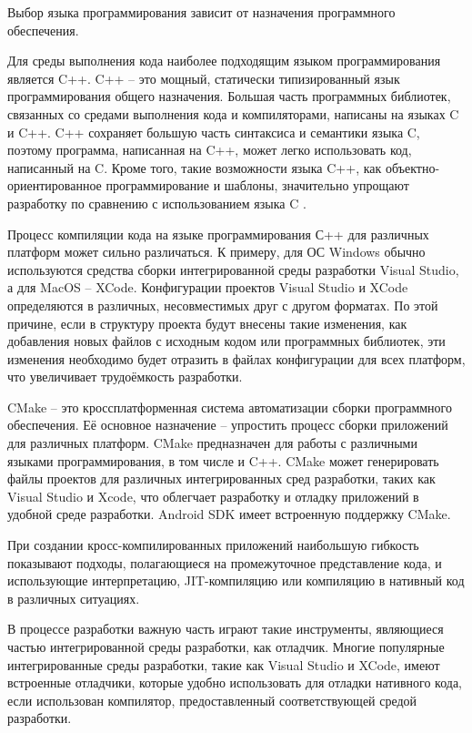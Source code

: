 Выбор языка программирования зависит от назначения программного обеспечения.

Для среды выполнения кода наиболее подходящим языком программирования является C++.
C++ -- это мощный, статически типизированный язык программирования общего назначения. 
Большая часть программных библиотек, связанных со средами выполнения кода и компиляторами, написаны на языках C и C++.
C++ сохраняет большую часть синтаксиса и семантики языка C, поэтому программа, написанная на C++, может легко использовать код, написанный на C.
Кроме того, такие возможности языка C++, как объектно-ориентированное программирование и шаблоны, значительно упрощают разработку по сравнению с использованием языка C \cite{CPlusPlus}.

Процесс компиляции кода на языке программирования С++ для различных платформ может сильно различаться.
К примеру, для ОС Windows обычно используются средства сборки интегрированной среды разработки Visual Studio, а для MacOS -- XCode.
Конфигурации проектов Visual Studio и XCode определяются в различных, несовместимых друг с другом форматах.
По этой причине, если в структуру проекта будут внесены такие изменения, как добавления новых файлов с исходным кодом или программных библиотек, эти изменения необходимо будет отразить в файлах конфигурации для всех платформ, что увеличивает трудоёмкость разработки.

CMake -- это кроссплатформенная система автоматизации сборки программного обеспечения. 
Её основное назначение -- упростить процесс сборки приложений для различных платформ. 
CMake предназначен для работы с различными языками программирования, в том числе и C++.
CMake может генерировать файлы проектов для различных интегрированных сред разработки, таких как Visual Studio и Xcode, что облегчает разработку и отладку приложений в удобной среде разработки.
Android SDK имеет встроенную поддержку CMake.

При создании кросс-компилированных приложений наибольшую гибкость показывают подходы, полагающиеся на промежуточное представление кода, и использующие интерпретацию, JIT-компиляцию или компиляцию в нативный код в различных ситуациях.

В процессе разработки важную часть играют такие инструменты, являющиеся частью интегрированной среды разработки, как отладчик.
Многие популярные интегрированные среды разработки, такие как Visual Studio и XCode, имеют встроенные отладчики, которые удобно использовать для отладки нативного кода, если использован компилятор, предоставленный соответствующей средой разработки.

